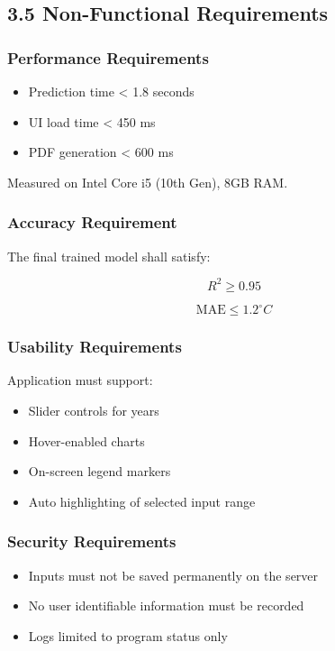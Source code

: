 \documentclass[12pt, a4paper]{article}
\begin{document}
\subsection{\textbf{3.5 Non-Functional Requirements}}

\subsubsection{\textbf{Performance Requirements}}

\begin{itemize}
\item Prediction time < 1.8 seconds
\item UI load time < 450 ms
\item PDF generation < 600 ms
\end{itemize}

\noindent
Measured on Intel Core i5 (10th Gen), 8GB RAM.

\subsubsection{\textbf{Accuracy Requirement}}

The final trained model shall satisfy:

\[
R^2 \geq 0.95
\]

\[
\text{MAE} \leq 1.2^\circ C
\]

\subsubsection{\textbf{Usability Requirements}}

Application must support:

\begin{itemize}
\item Slider controls for years  
\item Hover-enabled charts  
\item On-screen legend markers  
\item Auto highlighting of selected input range  
\end{itemize}

\subsubsection{\textbf{Security Requirements}}

\begin{itemize}
\item Inputs must not be saved permanently on the server
\item No user identifiable information must be recorded
\item Logs limited to program status only
\end{itemize}
\end{document}
